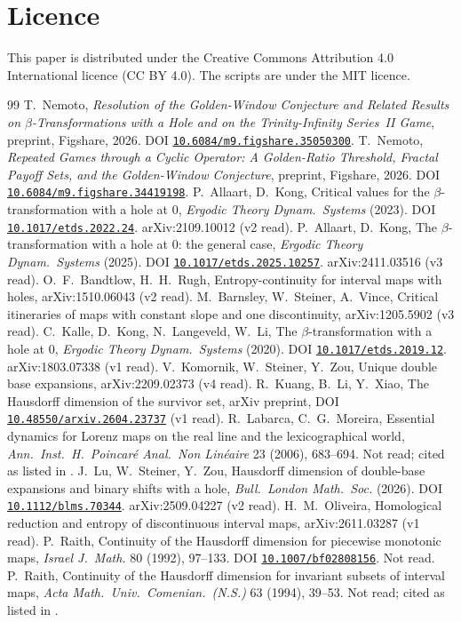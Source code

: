 \documentclass[11pt]{amsart}
\theoremstyle{definition}
\theoremstyle{remark}
\providecommand{\doi}[1]{DOI \href{https://doi.org/#1}{\nolinkurl{#1}}}
\begin{document}
\section*{Licence}
This paper is distributed under the Creative Commons Attribution 4.0 International licence (CC BY 4.0). The scripts are under the MIT licence.

\begin{thebibliography}{99}
 T.~Nemoto, \emph{Resolution of the Golden-Window Conjecture and Related Results on $\beta$-Transformations with a Hole and on the Trinity-Infinity Series~II Game}, preprint, Figshare, 2026. \doi{10.6084/m9.figshare.35050300}.
 T.~Nemoto, \emph{Repeated Games through a Cyclic Operator: A Golden-Ratio Threshold, Fractal Payoff Sets, and the Golden-Window Conjecture}, preprint, Figshare, 2026. \doi{10.6084/m9.figshare.34419198}.
 P.~Allaart, D.~Kong, Critical values for the $\beta$-transformation with a hole at $0$, \emph{Ergodic Theory Dynam.\ Systems} (2023). \doi{10.1017/etds.2022.24}. arXiv:2109.10012 (v2 read).
 P.~Allaart, D.~Kong, The $\beta$-transformation with a hole at $0$: the general case, \emph{Ergodic Theory Dynam.\ Systems} (2025). \doi{10.1017/etds.2025.10257}. arXiv:2411.03516 (v3 read).
 O.~F.~Bandtlow, H.~H.~Rugh, Entropy-continuity for interval maps with holes, arXiv:1510.06043 (v2 read).
 M.~Barnsley, W.~Steiner, A.~Vince, Critical itineraries of maps with constant slope and one discontinuity, arXiv:1205.5902 (v3 read).
 C.~Kalle, D.~Kong, N.~Langeveld, W.~Li, The $\beta$-transformation with a hole at $0$, \emph{Ergodic Theory Dynam.\ Systems} (2020). \doi{10.1017/etds.2019.12}. arXiv:1803.07338 (v1 read).
 V.~Komornik, W.~Steiner, Y.~Zou, Unique double base expansions, arXiv:2209.02373 (v4 read).
 R.~Kuang, B.~Li, Y.~Xiao, The Hausdorff dimension of the survivor set, arXiv preprint, \doi{10.48550/arxiv.2604.23737} (v1 read).
 R.~Labarca, C.~G.~Moreira, Essential dynamics for Lorenz maps on the real line and the lexicographical world, \emph{Ann.\ Inst.\ H.\ Poincar\'e Anal.\ Non Lin\'eaire} 23 (2006), 683--694. Not read; cited as listed in \cite{LSZ}.
 J.~Lu, W.~Steiner, Y.~Zou, Hausdorff dimension of double-base expansions and binary shifts with a hole, \emph{Bull.\ London Math.\ Soc.} (2026). \doi{10.1112/blms.70344}. arXiv:2509.04227 (v2 read).
 H.~M.~Oliveira, Homological reduction and entropy of discontinuous interval maps, arXiv:2611.03287 (v1 read).
 P.~Raith, Continuity of the Hausdorff dimension for piecewise monotonic maps, \emph{Israel J.\ Math.} 80 (1992), 97--133. \doi{10.1007/bf02808156}. Not read.
 P.~Raith, Continuity of the Hausdorff dimension for invariant subsets of interval maps, \emph{Acta Math.\ Univ.\ Comenian.\ (N.S.)} 63 (1994), 39--53. Not read; cited as listed in \cite{KKLL,AKgen}.
\end{thebibliography}
\end{document}
